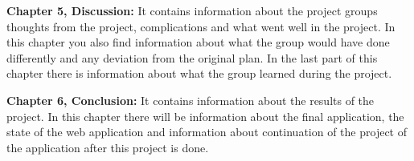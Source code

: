 \textbf{Chapter 5, Discussion:}
It contains information about the project groups thoughts from the project, complications and what went well in the project. In this chapter you also find information about what the group would have done differently and any deviation from the original plan. In the last part of this chapter there is information about what the group learned during the project.

\textbf{Chapter 6, Conclusion:}
It contains information about the results of the project. In this chapter there will be information about the final application, the state of the web application and information about continuation of the project of the application after this project is done.
